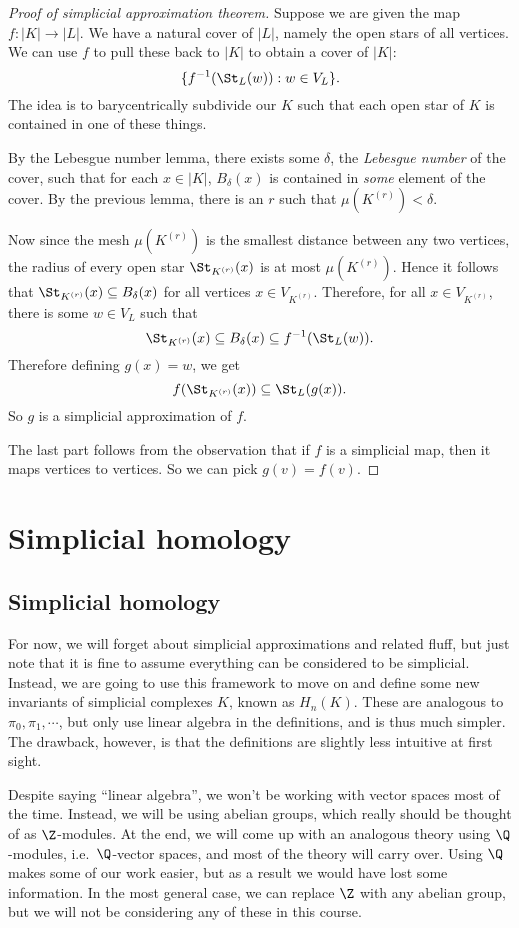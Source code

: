 \documentclass[a4paper]{article}
\begin{document}
\begin{proof}[Proof of simplicial approximation theorem]
  Suppose we are given the map $f: |K| \to |L|$. We have a natural cover of $|L|$, namely the open stars of all vertices. We can use $f$ to pull these back to $|K|$ to obtain a cover of $|K|$:
  \[
    \{f^{-1}(\St_L(w)) : w \in V_L\}.
  \]
  The idea is to barycentrically subdivide our $K$ such that each open star of $K$ is contained in one of these things.

  By the Lebesgue number lemma, there exists some $\delta$, the \emph{Lebesgue number} of the cover, such that for each $x \in |K|$, $B_\delta(x)$ is contained in \emph{some} element of the cover. By the previous lemma, there is an $r$ such that $\mu(K^{(r)}) < \delta$.

  Now since the mesh $\mu(K^{(r)})$ is the smallest distance between any two vertices, the radius of every open star $\St_{K^{(r)}}(x)$ is at most $\mu(K^{(r)})$. Hence it follows that $\St_{K^{(r)}}(x) \subseteq B_\delta(x)$ for all vertices $x \in V_{K^{(r)}}$. Therefore, for all $x \in V_{K^{(r)}}$, there is some $w \in V_L$ such that
  \[
    \St_{K^{(r)}}(x) \subseteq B_\delta(x) \subseteq f^{-1}(\St_L(w)).
  \]
  Therefore defining $g(x) = w$, we get
  \[
    f(\St_{K^{(r)}}(x)) \subseteq \St_L(g(x)).
  \]
  So $g$ is a simplicial approximation of $f$.

  The last part follows from the observation that if $f$ is a simplicial map, then it maps vertices to vertices. So we can pick $g(v) = f(v)$.
\end{proof}

\section{Simplicial homology}
\subsection{Simplicial homology}
For now, we will forget about simplicial approximations and related fluff, but just note that it is fine to assume everything can be considered to be simplicial. Instead, we are going to use this framework to move on and define some new invariants of simplicial complexes $K$, known as $H_n(K)$. These are analogous to $\pi_0, \pi_1, \cdots$, but only use linear algebra in the definitions, and is thus much simpler. The drawback, however, is that the definitions are slightly less intuitive at first sight.

Despite saying ``linear algebra'', we won't be working with vector spaces most of the time. Instead, we will be using abelian groups, which really should be thought of as $\Z$-modules. At the end, we will come up with an analogous theory using $\Q$-modules, i.e.\ $\Q$-vector spaces, and most of the theory will carry over. Using $\Q$ makes some of our work easier, but as a result we would have lost some information. In the most general case, we can replace $\Z$ with any abelian group, but we will not be considering any of these in this course.
\end{document}
